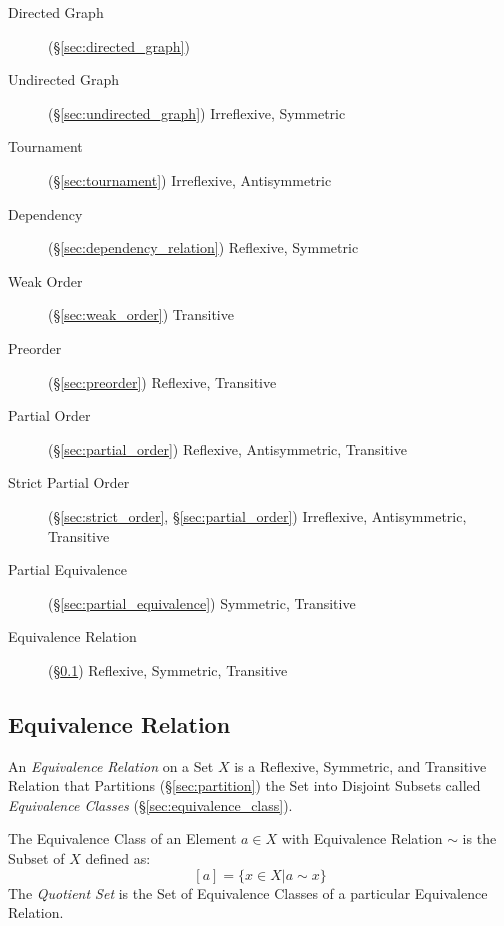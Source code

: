 \begin{description}
\item [Directed Graph] (\S\ref{sec:directed_graph})

\item [Undirected Graph] (\S\ref{sec:undirected_graph}) Irreflexive, Symmetric

\item [Tournament] (\S\ref{sec:tournament}) Irreflexive, Antisymmetric

\item [Dependency] (\S\ref{sec:dependency_relation}) Reflexive, Symmetric

\item [Weak Order] (\S\ref{sec:weak_order}) Transitive

\item [Preorder] (\S\ref{sec:preorder}) Reflexive, Transitive

\item [Partial Order] (\S\ref{sec:partial_order}) Reflexive,
  Antisymmetric, Transitive

\item [Strict Partial Order] (\S\ref{sec:strict_order},
  \S\ref{sec:partial_order}) Irreflexive, Antisymmetric, Transitive

\item [Partial Equivalence] (\S\ref{sec:partial_equivalence})
  Symmetric, Transitive

\item [Equivalence Relation] (\S\ref{sec:equivalence_relation})
  Reflexive, Symmetric, Transitive

\end{description}



\subsection{Equivalence Relation}\label{sec:equivalence_relation}

An \emph{Equivalence Relation} on a Set $X$ is a Reflexive, Symmetric,
and Transitive Relation that Partitions (\S\ref{sec:partition}) the
Set into Disjoint Subsets called \emph{Equivalence Classes}
(\S\ref{sec:equivalence_class}).

The Equivalence Class of an Element $a \in X$ with Equivalence
Relation $\sim$ is the Subset of $X$ defined as:
\[
    [a] = \{x \in X | a \sim x\}
\]
The \emph{Quotient Set} is the Set of Equivalence Classes of a
particular Equivalence Relation.

